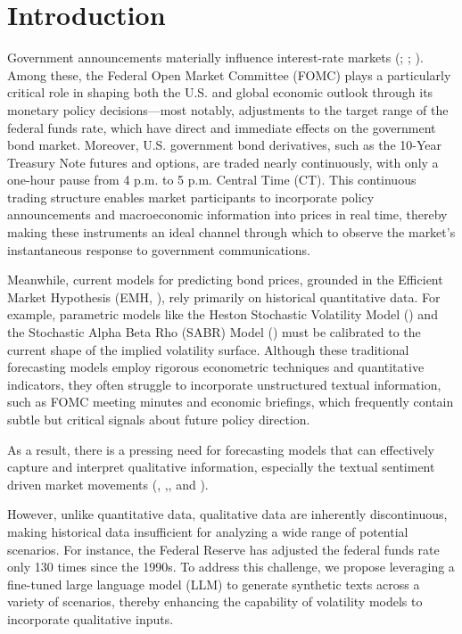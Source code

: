 \section{Introduction}\label{ch2:sec:introduction}


Government announcements materially influence interest-rate markets (\cite{vergote2012}; \cite{rosa2013financial}; \cite{jubinski2013fomc}). Among these, the Federal Open Market Committee (FOMC) plays a particularly critical role in shaping both the U.S. and global economic outlook through its monetary policy decisions—most notably, adjustments to the target range of the federal funds rate, which have direct and immediate effects on the government bond market. Moreover, U.S. government bond derivatives, such as the 10-Year Treasury Note futures and options, are traded nearly continuously, with only a one-hour pause from 4 p.m. to 5 p.m. Central Time (CT). This continuous trading structure enables market participants to incorporate policy announcements and macroeconomic information into prices in real time, thereby making these instruments an ideal channel through which to observe the market’s instantaneous response to government communications.


Meanwhile, current models for predicting bond prices, grounded in the Efficient Market Hypothesis (EMH, \cite{fama1970}), rely primarily on historical quantitative data. For example, parametric models like the Heston Stochastic Volatility Model (\cite{Heston:1993}) and the Stochastic Alpha Beta Rho (SABR) Model (\cite{sabr2002}) must be calibrated to the current shape of the implied volatility surface. Although these traditional forecasting models employ rigorous econometric techniques and quantitative indicators, they often struggle to incorporate unstructured textual information, such as FOMC meeting minutes and economic briefings, which frequently contain subtle but critical signals about future policy direction.



As a result, there is a pressing need for forecasting models that can effectively capture and interpret qualitative information, especially the textual sentiment driven market movements (\cite{bollen2011twitter}, \cite{ding2015deep},\cite{ding2016knowledge}, and \cite{xu2018stock}).


However, unlike quantitative data, qualitative data are inherently discontinuous, making historical data insufficient for analyzing a wide range of potential scenarios. For instance, the Federal Reserve has adjusted the federal funds rate only 130 times since the 1990s. To address this challenge, we propose leveraging a fine-tuned large language model (LLM) to generate synthetic texts across a variety of scenarios, thereby enhancing the capability of volatility models to incorporate qualitative inputs.




